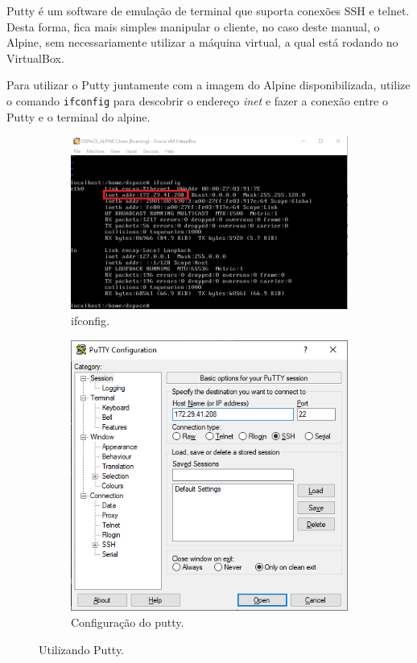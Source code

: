 Putty é um software de emulação de terminal que suporta conexões SSH e telnet. Desta forma, fica mais simples manipular o cliente, no caso deste manual, o Alpine, sem necessariamente utilizar a máquina virtual, a qual está rodando no VirtualBox.

Para utilizar o Putty juntamente com a imagem do Alpine disponibilizada, utilize o comando \lstinline{ifconfig} para descobrir o endereço \textit{inet} e fazer a conexão entre o Putty e o terminal do alpine.

 \begin{figure}[h]
 
     \begin{subfigure}{0.6\textwidth}
     \includegraphics[width=0.9\linewidth]{../images/putty2.png} 
     \caption{ifconfig.}
     \end{subfigure}
     \begin{subfigure}{0.4\textwidth}
     \includegraphics[width=0.9\linewidth]{../images/putty3.png}
     \caption{Configuração do putty.}
     \end{subfigure}
 
 \caption{Utilizando Putty.}
 \end{figure}

